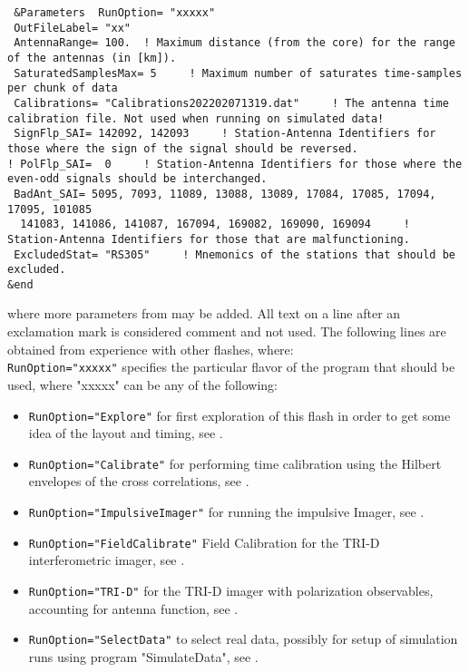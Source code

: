 \begin{linenumbers}
\resetlinenumber
\begin{verbatim}
 &Parameters  RunOption= "xxxxx"
 OutFileLabel= "xx"
 AntennaRange= 100.  ! Maximum distance (from the core) for the range of the antennas (in [km]).
 SaturatedSamplesMax= 5     ! Maximum number of saturates time-samples per chunk of data
 Calibrations= "Calibrations202202071319.dat"     ! The antenna time calibration file. Not used when running on simulated data!
 SignFlp_SAI= 142092, 142093     ! Station-Antenna Identifiers for those where the sign of the signal should be reversed.
! PolFlp_SAI=  0     ! Station-Antenna Identifiers for those where the even-odd signals should be interchanged.
 BadAnt_SAI= 5095, 7093, 11089, 13088, 13089, 17084, 17085, 17094, 17095, 101085
  141083, 141086, 141087, 167094, 169082, 169090, 169094     ! Station-Antenna Identifiers for those that are malfunctioning.
 ExcludedStat= "RS305"     ! Mnemonics of the stations that should be excluded.
&end
\end{verbatim}
\end{linenumbers}
where more parameters from  may be added. All text on a line after an exclamation mark is considered comment and not used. The following lines are obtained from experience with other flashes, where:
\\\verb!RunOption="xxxxx"! specifies the particular flavor of the program that should be used, where "xxxxx" can be any of the following:
\begin{itemize}
\item \verb!RunOption="Explore"! for first exploration of this flash in order to get some idea of the layout and timing, see .
\item \verb!RunOption="Calibrate"! for performing time calibration using the Hilbert envelopes of the cross correlations, see .
\item \verb!RunOption="ImpulsiveImager"! for running the impulsive Imager, see .
\item \verb!RunOption="FieldCalibrate"! Field Calibration for the TRI-D interferometric imager, see .
\item \verb!RunOption="TRI-D"! for the TRI-D imager with polarization observables, accounting for antenna function, see .
\item \verb!RunOption="SelectData"! to select real data, possibly for setup of simulation runs using program "SimulateData", see .
\end{itemize}
